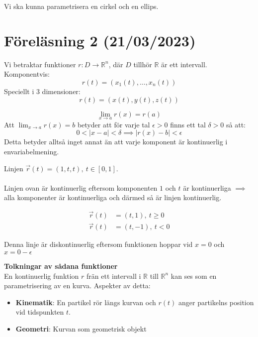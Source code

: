 \documentclass{report}
\begin{document}
Vi ska kunna parametrisera en cirkel och en ellips.

\pagebreak
\section{Föreläsning 2 (21/03/2023)}

{
Vi betraktar funktioner $ r: D \to \mathbb{R}^n $, där $ D $ tillhör $ \mathbb{R} $ är ett intervall. Komponentvis:
\begin{equation*}
r(t) = (x_1(t), \ldots , x_n(t))
\end{equation*}
Speciellt i 3 dimensioner:
\begin{equation*}
r(t) = (x(t), y(t), z(t))
\end{equation*}
}

{
\begin{equation*}
\lim_{x \to a} r(x) = r(a)
\end{equation*}
Att $ \lim_{x \to a} r(x) = b $ betyder att för varje tal $ \epsilon > 0 $ finns ett tal $ \delta > 0 $ så att:
\begin{equation*}
0 < |x-a| < \delta \implies |r(x) -b | < \epsilon
\end{equation*}
Detta betyder alltså inget annat än att varje komponent är kontinuerlig i envariabelmening. 
}

\ex{}
{
	Linjen $ \vec{r} (t) = (1,t,t), \: t \in [0,1] $.\\\\

	Linjen ovan är kontinuerlig eftersom komponenten $ 1 $ och $ t $ är kontinuerliga $ \implies  $ alla komponenter är kontinuerliga och därmed så är linjen kontinuerlig.
}

\ex{}
{
\begin{align*}
	\vec{r}(t) &= (t, 1), \: t \ge 0\\
	\vec{r} (t) &= (t,-1), \: t < 0
\end{align*}

Denna linje är diskontinuerlig eftersom funktionen hoppar vid $ x = 0 $ och $ x = 0 - \epsilon $  
}

\vspace{20pt}
\textbf{Tolkningar av sådana funktioner}\\
En kontinuerlig funktion $ r $ frän ett intervall i $ \mathbb{R} $ till $ \mathbb{R}^n $ kan ses som en parametrisering av en kurva. Aspekter av detta:
\begin{itemize}
	\item \textbf{Kinematik}: En partikel rör längs kurvan och $ r(t) $ anger partikelns position vid tidspunkten $ t $.\\
	\item \textbf{Geometri}: Kurvan som geometrisk objekt
\end{itemize}
\end{document}
